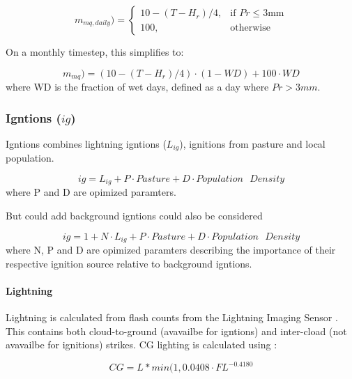 \begin{equation}
     m_{mq, daily})=
        \begin{cases}
            10 - (T - H_r) / 4 ,& \text{if } Pr\leq 3 \text{mm}\\
            100,              & \text{otherwise}
        \end{cases}
\end{equation}

On a monthly timestep, this simplifies to:

\begin{equation}
     m_{mq})=
        (10 - (T - H_r) / 4) \cdot (1 - WD)
        + 100 \cdot WD
\end{equation}
where WD is the fraction of wet days, defined as a day where $Pr > 3mm$.


\subsubsection{Igntions ($ig$)}

Igntions combines lightning igntions ($L_{ig}$), ignitions from pasture and local population.

\begin{equation}
    ig = L_{ig} + P \cdot Pasture + D \cdot Population\text{ }Density
\end{equation}
where P and D are opimized paramters.

But could add background igntions could also be considered

\begin{equation}
     ig = 1 + N \cdot L_{ig} + P \cdot Pasture + D \cdot Population\text{ }Density
\end{equation}
where N, P and D are opimized paramters describing the importance of their respective ignition source relative to background igntions.

\paragraph{Lightning}

Lightning is calculated from flash counts
from the Lightning Imaging Sensor \citep[LIS][http://grip.nsstc.nasa.gov/]{christian1999optical, christian1999lightning}.
This contains both cloud-to-ground (avavailbe for igntions) and inter-cload (not avavailbe for ignitions) strikes.
CG lighting is calculated using \citet{kelley2014improved}:

\begin{equation}
    CG = L * min(1, 0.0408 \cdot FL^{-0.4180}
\end{equation}

